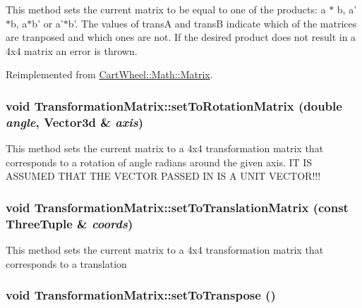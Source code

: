 \label{classCartWheel_1_1Math_1_1TransformationMatrix_aa30793678e416efa275e9ede54650bff}
This method sets the current matrix to be equal to one of the products: a $\ast$ b, a'$\ast$b, a$\ast$b' or a'$\ast$b'. The values of transA and transB indicate which of the matrices are tranposed and which ones are not. If the desired product does not result in a 4x4 matrix an error is thrown. 

Reimplemented from \hyperlink{classCartWheel_1_1Math_1_1Matrix_ac2f4452cecbb5ffdaf6df379229fa22e}{CartWheel::Math::Matrix}.

\hypertarget{classCartWheel_1_1Math_1_1TransformationMatrix_a1f77e7d1728a2acccfdedd8accd0cab1}{
\subsubsection[{setToRotationMatrix}]{\setlength{\rightskip}{0pt plus 5cm}void TransformationMatrix::setToRotationMatrix (double {\em angle}, \/  {\bf Vector3d} \& {\em axis})}}
\label{classCartWheel_1_1Math_1_1TransformationMatrix_a1f77e7d1728a2acccfdedd8accd0cab1}
This method sets the current matrix to a 4x4 transformation matrix that corresponds to a rotation of angle radians around the given axis. IT IS ASSUMED THAT THE VECTOR PASSED IN IS A UNIT VECTOR!!! \hypertarget{classCartWheel_1_1Math_1_1TransformationMatrix_a309ebb736c07ce6a94b3a5446e139936}{
\subsubsection[{setToTranslationMatrix}]{\setlength{\rightskip}{0pt plus 5cm}void TransformationMatrix::setToTranslationMatrix (const {\bf ThreeTuple} \& {\em coords})}}
\label{classCartWheel_1_1Math_1_1TransformationMatrix_a309ebb736c07ce6a94b3a5446e139936}
This method sets the current matrix to a 4x4 transformation matrix that corresponds to a translation \hypertarget{classCartWheel_1_1Math_1_1TransformationMatrix_a934946ab95fb6777ae21f5c26082d6bc}{
\subsubsection[{setToTranspose}]{\setlength{\rightskip}{0pt plus 5cm}void TransformationMatrix::setToTranspose ()}}
